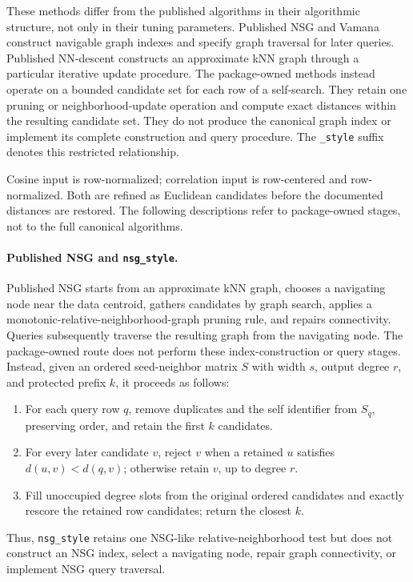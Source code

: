 \documentclass[11pt]{article}
\newcommand{\code}[1]{\texttt{#1}}
\begin{document}
These methods differ from the published algorithms in their algorithmic
structure, not only in their tuning parameters. Published NSG and Vamana
construct navigable graph indexes and specify graph traversal for later
queries. Published NN-descent constructs an approximate kNN graph through a
particular iterative update procedure. The package-owned methods instead
operate on a bounded candidate set for each row of a self-search. They retain
one pruning or neighborhood-update operation and compute exact distances
within the resulting candidate set. They do not produce the canonical graph
index or implement its complete construction and query procedure. The
\code{\_style} suffix denotes this restricted relationship.

Cosine input is row-normalized; correlation input is row-centered and
row-normalized. Both are refined as Euclidean candidates before the
documented distances are restored. The following descriptions refer to
package-owned stages, not to the full canonical algorithms.

\paragraph{Published NSG and \code{nsg\_style}.}
Published NSG starts from an approximate kNN graph, chooses a navigating node
near the data centroid, gathers candidates by graph search, applies a
monotonic-relative-neighborhood-graph pruning rule, and repairs connectivity.
Queries subsequently traverse the resulting graph from the navigating node.
The package-owned route does not perform these index-construction or query
stages. Instead, given an ordered seed-neighbor matrix $S$ with width $s$,
output degree $r$, and protected prefix $k$, it proceeds as follows:
\begin{enumerate}
\item For each query row $q$, remove duplicates and the self identifier from
      $S_q$, preserving order, and retain the first $k$ candidates.
\item For every later candidate $v$, reject $v$ when a retained $u$ satisfies
      $d(u,v)<d(q,v)$; otherwise retain $v$, up to degree $r$.
\item Fill unoccupied degree slots from the original ordered candidates and
      exactly rescore the retained row candidates; return the closest $k$.
\end{enumerate}
Thus, \code{nsg\_style} retains one NSG-like relative-neighborhood test but
does not construct an NSG index, select a navigating node, repair graph
connectivity, or implement NSG query traversal.
\end{document}
